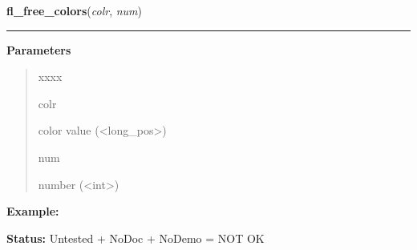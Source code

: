 \hspace{.8\funcindent}\begin{boxedminipage}{\funcwidth}

    \raggedright \textbf{fl\_free\_colors}(\textit{colr}, \textit{num})

    \vspace{-1.5ex}

    \rule{\textwidth}{0.5\fboxrule}
\setlength{\parskip}{2ex}
\setlength{\parskip}{1ex}
      \textbf{Parameters}
      \vspace{-1ex}

      \begin{quote}
        \begin{Ventry}{xxxx}

          \item[colr]

          color value ({\textless}long\_pos{\textgreater})

          \item[num]

          number ({\textless}int{\textgreater})

        \end{Ventry}

      \end{quote}

\textbf{Example:} 

\textbf{Status:} Untested + NoDoc + NoDemo = NOT OK



    \end{boxedminipage}

    \label{xformslib:library:fl_free_pixels}

    \vspace{0.5ex}

